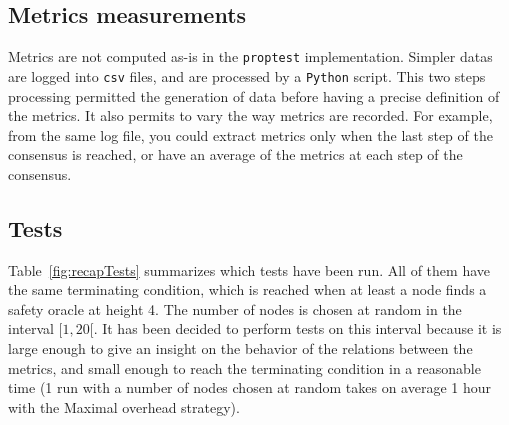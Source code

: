\subsection{Metrics measurements}
Metrics are not computed as-is in the \texttt{proptest} implementation. Simpler
datas are logged into \texttt{csv} files, and are processed by a \texttt{Python}
script.  This two steps processing permitted the generation of
data before having a precise definition of the metrics. It also permits to vary
the way metrics are recorded. For example, from the same log file, you could
extract metrics only when the last step of the consensus is reached, or have an
average of the metrics at each step of the consensus.

\subsection{Tests}
Table~\ref{fig:recapTests} summarizes which tests have been run.
All of them have the same terminating condition, which is reached when at least a
node finds a safety oracle at height 4. The number of nodes is chosen at random
in the interval \([1, 20[\). It has been decided to perform tests on this
interval because it is large enough to give an insight on the behavior of the
relations between the metrics, and small enough to reach the terminating condition in
a reasonable time (1 run with a number of nodes chosen at random takes on average 1 hour
with the Maximal overhead strategy).


\begin{table}[H]
\end{table}


